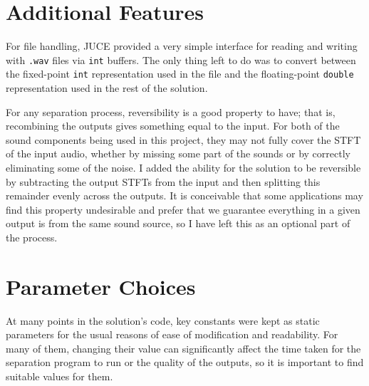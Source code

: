 \documentclass[10pt,twoside,a4paper]{report}
\begin{document}
\section{Additional Features}

For file handling, JUCE provided a very simple interface for reading and writing with \texttt{.wav} files via \texttt{int} buffers. The only thing left to do was to convert between the fixed-point \texttt{int} representation used in the file and the floating-point \texttt{double} representation used in the rest of the solution.

For any separation process, reversibility is a good property to have; that is, recombining the outputs gives something equal to the input. For both of the sound components being used in this project, they may not fully cover the STFT of the input audio, whether by missing some part of the sounds or by correctly eliminating some of the noise. I added the ability for the solution to be reversible by subtracting the output STFTs from the input and then splitting this remainder evenly across the outputs. It is conceivable that some applications may find this property undesirable and prefer that we guarantee everything in a given output is from the same sound source, so I have left this as an optional part of the process.

\section{Parameter Choices}

At many points in the solution's code, key constants were kept as static parameters for the usual reasons of ease of modification and readability. For many of them, changing their value can significantly affect the time taken for the separation program to run or the quality of the outputs, so it is important to find suitable values for them.
\end{document}
